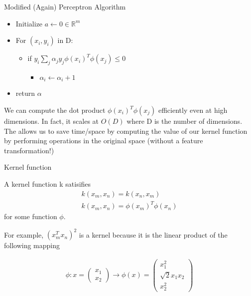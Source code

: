 Modified (Again) Perceptron Algorithm
\begin{itemize}
    \item Initialize $a \leftarrow 0 \in \mathbb{R}^{m}$
    \item For $(x_i, y_i)$ in D:
    \begin{itemize}
        \item if $y_i \sum_j \alpha_j y_j \phi(x_i)^T \phi(x_j) \leq 0$
        \begin{itemize}
            \item $\alpha_i \leftarrow \alpha_i + 1$
        \end{itemize}
    \end{itemize}
    \item return $\alpha$
\end{itemize}

We can compute the dot product $\phi(x_i)^T \phi(x_j)$ efficiently even at high dimensions. In fact, it scales at $O(D)$ where D is the number of dimensions. The  allows us to save time/space by computing the value of our kernel function by performing operations in the original space (without a feature transformation!) 

\begin{definition}
    Kernel function

    A kernel function k satisifies 
    \begin{gather*}
        k(x_m, x_n)   = k(x_n, x_m) \\
        k(x_m, x_n) = \phi(x_m)^T \phi(x_n)
    \end{gather*}
    for some function $\phi$.
    
    For example, $(x_m^Tx_n)^2$ is a kernel because it is the linear product of the following mapping

    \begin{align*}
        \phi: x = \begin{pmatrix}
            x_1 \\
            x_2
        \end{pmatrix} \rightarrow \phi(x) = \begin{pmatrix}
            x_1^2 \\
            \sqrt{2}x_1x_2 \\
            x_2^2
        \end{pmatrix}
    \end{align*}
\end{definition}

